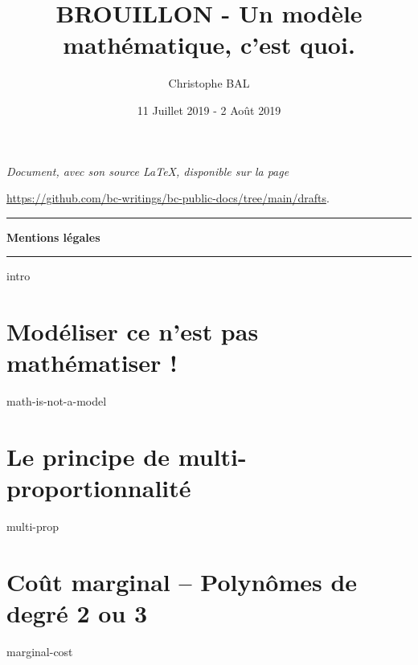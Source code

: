 \documentclass[12pt]{amsart}
\let\oldsection\section
\renewcommand\section[1]{\vfill\pagebreak\oldsection{#1}}
\begin{document}
\title{BROUILLON - Un modèle mathématique, c'est quoi.}
\author{Christophe BAL}
\date{11 Juillet 2019 - 2 Août 2019}


\maketitle

\begin{center}
	\itshape
	Document, avec son source \LaTeX, disponible sur la page

	\url{https://github.com/bc-writings/bc-public-docs/tree/main/drafts}.
\end{center}


\bigskip


\begin{center}
	\hrule\vspace{.3em}
	{
		\fontsize{1.35em}{1em}\selectfont
		\textbf{Mentions \og légales \fg}
	}

	\vspace{0.45em}
	\doclicenseThis
	\hrule
\end{center}



\setcounter{tocdepth}{1}
\tableofcontents




{intro}





\section{Modéliser ce n'est pas mathématiser !}

{math-is-not-a-model}




\section{Le principe de \og multi-proportionnalité \fg}

{multi-prop}




\section{Coût marginal -- Polynômes de degré 2 ou 3}

{marginal-cost}
\end{document}
